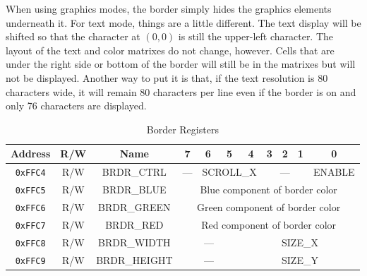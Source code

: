 When using graphics modes, the border simply hides the graphics elements underneath it. For text mode, things are a little different. The text display will be shifted so that the character at $(0, 0)$ is still the upper-left character. The layout of the text and color matrixes do not change, however. Cells that are under the right side or bottom of the border will still be in the matrixes but will not be displayed. Another way to put it is that, if the text resolution is 80 characters wide, it will remain 80 characters per line even if the border is on and only 76 characters are displayed.

\begin{table}[ht]
    \begin{center}
        \begin{tabular}{|c|c|c|c|c|c|c|c|c|c|c|} \hline
            Address & R/W & Name & 7 & 6 & 5 & 4 & 3 & 2 & 1 & 0 \\\hline\hline
            \verb+0xFFC4+ & R/W & BRDR\_CTRL & --- & \multicolumn{3}{|c|}{SCROLL\_X} & \multicolumn{3}{|c|}{---} & ENABLE \\ \hline
            \verb+0xFFC5+ & R/W & BRDR\_BLUE & \multicolumn{8}{|c|}{Blue component of border color} \\ \hline
            \verb+0xFFC6+ & R/W & BRDR\_GREEN & \multicolumn{8}{|c|}{Green component of border color} \\ \hline
            \verb+0xFFC7+ & R/W & BRDR\_RED & \multicolumn{8}{|c|}{Red component of border color} \\ \hline
            \verb+0xFFC8+ & R/W & BRDR\_WIDTH & \multicolumn{3}{|c|}{---} & \multicolumn{5}{|c|}{SIZE\_X} \\ \hline
            \verb+0xFFC9+ & R/W & BRDR\_HEIGHT & \multicolumn{3}{|c|}{---} & \multicolumn{5}{|c|}{SIZE\_Y} \\ \hline
        \end{tabular}
    \end{center}
    \caption{Border Registers}
    \label{tab:brdr_reg}
\end{table}

